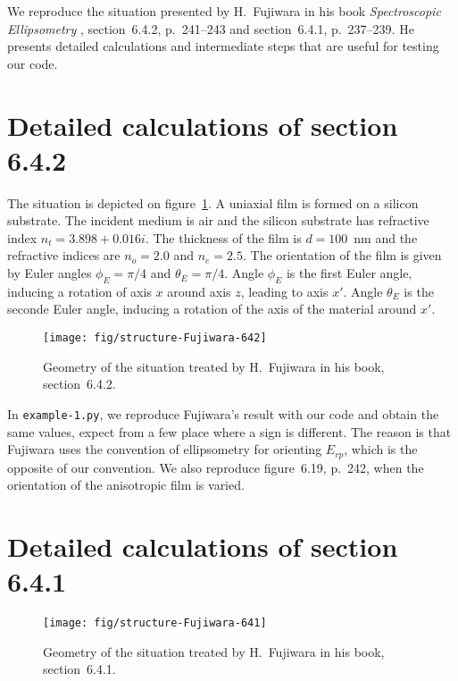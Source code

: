 

We reproduce the situation presented by H.~Fujiwara in his book \emph{Spectroscopic Ellipsometry} \cite{Fujiwara}, section~6.4.2, p.~241--243 and section~6.4.1, p.~237--239.
He presents detailed calculations and intermediate steps that are useful for testing our code.


\section{Detailed calculations of section 6.4.2}

The situation is depicted on figure~\ref{fig:situation642}.
A uniaxial film is formed on a silicon substrate.
The incident medium is air and the silicon substrate has refractive index $n_t = 3.898 + 0.016i$.
The thickness of the film is $d = 100$~nm and the refractive indices are $n_o = 2.0$ and $n_e=2.5$. 
The orientation of the film is given by Euler angles $\phi_E=\pi/4$ and $\theta_E = \pi/4$.
Angle $\phi_E$ is the first Euler angle, inducing a rotation of axis $x$ around axis $z$, leading to axis $x'$.
Angle $\theta_E$ is the seconde Euler angle, inducing a rotation of the axis of the material around $x'$.

\begin{figure}[b]
\texttt{[image: fig/structure-Fujiwara-642]}
\caption{\label{fig:situation642}Geometry of the situation treated by H.~Fujiwara in his book, section~6.4.2.}
\end{figure}

In \verb/example-1.py/, we reproduce Fujiwara's result with our code and obtain the same values, expect from a few place where a sign is different.
The reason is that Fujiwara uses the convention of ellipsometry for orienting $E_{rp}$, which is the opposite of our convention.
We also reproduce figure~6.19, p.~242, when the orientation of the anisotropic film is varied.

\vspace{10cm}
\mbox{}
\vspace{7cm}

\section{Detailed calculations of section 6.4.1}

\begin{figure}[b]
\texttt{[image: fig/structure-Fujiwara-641]}
\caption{\label{fig:situation641}Geometry of the situation treated by H.~Fujiwara in his book, section~6.4.1.}
\end{figure}

